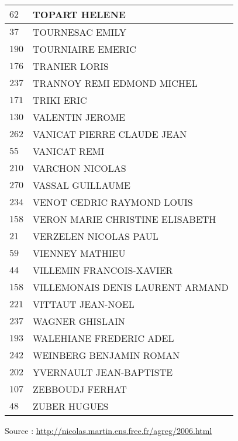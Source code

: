 \begin{xltabular}{\linewidth}{|l|X|}
    \hline
    $62$ & TOPART HELENE \\
    \hline
    $37$ & TOURNESAC EMILY \\
    \hline
    $190$ & TOURNIAIRE EMERIC \\
    \hline
    $176$ & TRANIER LORIS \\
    \hline
    $237$ & TRANNOY REMI EDMOND MICHEL \\
    \hline
    $171$ & TRIKI ERIC \\
    \hline
    $130$ & VALENTIN JEROME \\
    \hline
    $262$ & VANICAT PIERRE CLAUDE JEAN \\
    \hline
    $55$ & VANICAT REMI \\
    \hline
    $210$ & VARCHON NICOLAS \\
    \hline
    $270$ & VASSAL GUILLAUME \\
    \hline
    $234$ & VENOT CEDRIC RAYMOND LOUIS \\
    \hline
    $158$ & VERON MARIE CHRISTINE ELISABETH \\
    \hline
    $21$ & VERZELEN NICOLAS PAUL \\
    \hline
    $59$ & VIENNEY MATHIEU \\
    \hline
    $44$ & VILLEMIN FRANCOIS-XAVIER \\
    \hline
    $158$ & VILLEMONAIS DENIS LAURENT ARMAND \\
    \hline
    $221$ & VITTAUT JEAN-NOEL \\
    \hline
    $237$ & WAGNER GHISLAIN \\
    \hline
    $193$ & WALEHIANE FREDERIC ADEL \\
    \hline
    $242$ & WEINBERG BENJAMIN ROMAN \\
    \hline
    $202$ & YVERNAULT JEAN-BAPTISTE \\
    \hline
    $107$ & ZEBBOUDJ FERHAT \\
    \hline
    $48$ & ZUBER HUGUES \\
    \hline
  \end{xltabular}

  \begin{flushright}
    {\tiny Source : \url{http://nicolas.martin.ens.free.fr/agreg/2006.html}}
  \end{flushright}


